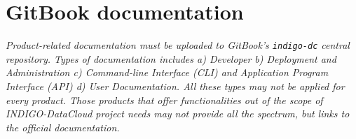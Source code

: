 \section{GitBook documentation}
\footnotesize
\textcolor{gray!90}{\textit{Product-related documentation must be uploaded to GitBook's \texttt{indigo-dc} central repository. Types of documentation includes a) Developer b) Deployment and Administration c) Command-line Interface (CLI) and Application Program Interface (API) d) User Documentation. All these types may not be applied for every product. Those products that offer functionalities out of the scope of INDIGO-DataCloud project needs may not provide all the spectrum, but links to the
official documentation.}}
\normalsize
\\[0.1in]

